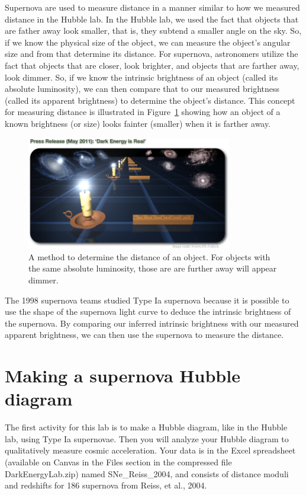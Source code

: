 Supernova are used to measure distance in a manner similar to how we
measured distance in the Hubble lab. In the Hubble lab, we used the fact
that objects that are father away look smaller, that is, they subtend a
smaller angle on the sky. So, if we know the physical size of the object,
we can measure the object’s angular size and from that determine its
distance. For supernova, astronomers utilize the fact that objects that
are closer, look brighter, and objects that are farther away, look dimmer.
So, if we know the intrinsic brightness of an object (called its absolute
luminosity), we can then compare that to our measured brightness
(called its apparent brightness) to determine the object’s distance. This
concept for measuring distance is illustrated in Figure~\ref{de:fig:candles} showing how an object of a known brightness (or size) looks fainter
(smaller) when it is farther away.

\begin{figure}
	\centering
	\includegraphics[width=0.8\textwidth]{dark-energy/candles}
	\caption{A method to determine the distance of an object. For objects with the same absolute luminosity, those are are further away will appear dimmer.}\label{de:fig:candles}
\end{figure}

The 1998 supernova teams studied Type Ia supernova because it is
possible to use the shape of the supernova light curve to deduce the
intrinsic brightness of the supernova. By comparing our inferred
intrinsic brightness with our measured apparent brightness, we can
then use the supernova to measure the distance.

\section{Making a supernova Hubble diagram}

The first activity for this lab is to make a Hubble diagram, like in the
Hubble lab, using Type Ia supernovae. Then you will analyze your Hubble diagram to qualitatively measure cosmic acceleration. Your data is in the Excel spreadsheet (available on Canvas in the Files section in the compressed file DarkEnergyLab.zip) named SNe\_Reiss\_2004, and consists of distance moduli
and redshifts for 186 supernova from Reiss, et al., 2004.

